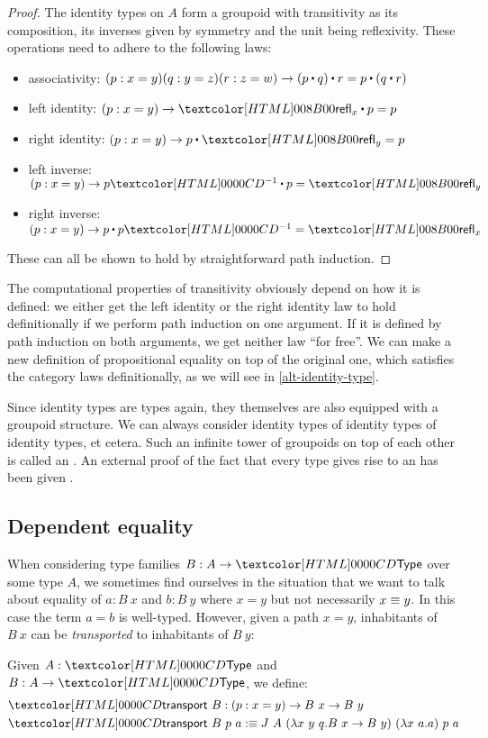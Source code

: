 \begin{proof}
  The identity types on $A$ form a groupoid with transitivity as its
  composition, its inverses given by symmetry and the unit being
  reflexivity. These operations need to adhere to the following laws:
  \begin{itemize}
  \item associativity: $(p : x = y) (q : y = z) (r : z = w) \to \trans{(\trans{p}{q})}{r} = \trans{p}{(\trans{q}{r})}$
  \item left identity: $(p : x = y) \to \trans{\refl_x}{p} = p$
  \item right identity: $(p : x = y) \to \trans{p}{\refl_y} = p$
  \item left inverse: $(p : x = y) \to \trans{\sym{p}}{p} = \refl_y$
  \item right inverse: $(p : x = y) \to \trans{p}{\sym{p}} = \refl_x$
  \end{itemize}
  These can all be shown to hold by straightforward path induction.
\end{proof}

\begin{remark}
  The computational properties of transitivity obviously depend on how
  it is defined: we either get the left identity or the right identity
  law to hold definitionally if we perform path induction on one
  argument. If it is defined by path induction on both arguments, we
  get neither law ``for free''. We can make a new definition of
  propositional equality on top of the original one, which satisfies
  the category laws definitionally, as we will see in
  \cref{alt-identity-type}.
\end{remark}

Since identity types are types again, they themselves are also
equipped with a groupoid structure. We can always consider identity
types of identity types of identity types, et cetera. Such an infinite
tower of groupoids on top of each other is called an \inftygrpd. An
external proof of the fact that every type gives rise to an \inftygrpd
has been given \cite{VanDenBerg2011,Lumsdaine2009}.

\subsection{Dependent equality}

When considering type families $B : A \to \Type$ over some type $A$, we
sometimes find ourselves in the situation that we want to talk about
equality of $a : B\ x$ and $b : B\ y$ where $x = y$ but not
necessarily $x \equiv y$. In this case the term $a = b$ is
well-typed. However, given a path $x = y$, inhabitants of $B\ x$ can
be \emph{transported} to inhabitants of $B\ y$:
\begin{definition}
  Given $A : \Type$ and $B : A \to \Type$, we define:
  \begin{align*}
    &\transport\ B : (p : x = y) \to B\ x \to B\ y \\
    &\transport\ B\ p\ a \ddefeq J\ A\ (\lambda x\ y\ q . B\ x \to B\ y)\ (\lambda x\ a . a)\ p\ a
  \end{align*}
\end{definition}

